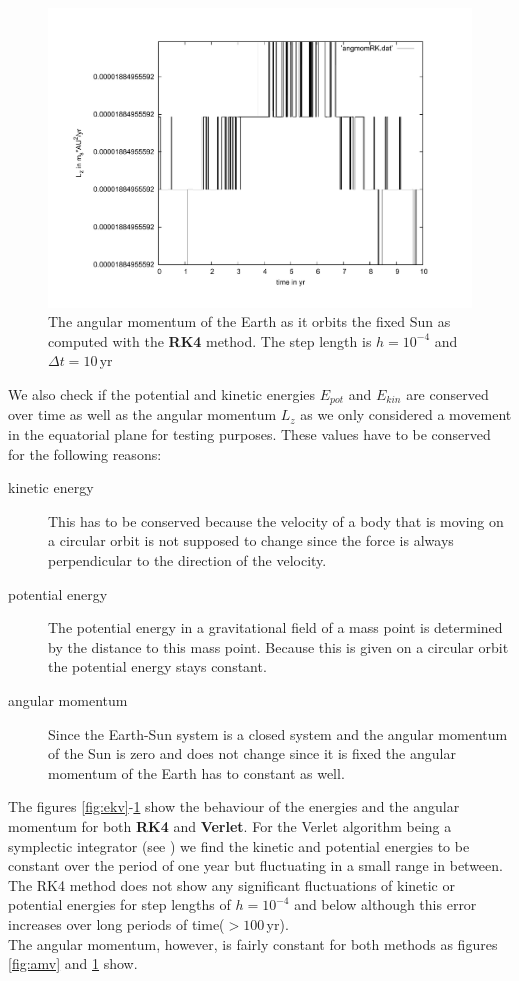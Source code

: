 \documentclass[11pt,a4wide]{article}
\begin{document}
	\begin{figure}
		\centering
			\includegraphics[scale=0.45]{angmomRK.pdf}
		\caption{The angular momentum of the Earth as it orbits the fixed Sun as computed with the \textbf{RK4} method. The step length is $h=10^{-4}$ and $\Delta t=10$\,yr}
		\label{fig:amrk}
	\end{figure}
We also check if the potential and kinetic energies $E_{pot}$ and $E_{kin}$ are conserved over time as well as the angular momentum $L_z$ as we only considered a movement in the equatorial plane for testing purposes. These values have to be conserved for the following reasons:
 \begin{description}
	\item[kinetic energy] This has to be conserved because the velocity of a body that is moving on a circular orbit is not supposed to change since the force is always perpendicular to the direction of the velocity.
	\item[potential energy] The potential energy in a gravitational field of a mass point is determined by the distance to this mass point. Because this is given on a circular orbit the potential energy stays constant.
	\item[angular momentum] Since the Earth-Sun system is a closed system and the angular momentum of the Sun is zero and does not change since it is fixed the angular momentum of the Earth has to constant as well.
 \end{description}

The figures \ref{fig:ekv}-\ref{fig:amrk} show the behaviour of the energies and the angular momentum for both \textbf{RK4} and \textbf{Verlet}. For the Verlet algorithm being a symplectic integrator (see \cite{Donnelly}) we find the kinetic and potential energies to be constant over the period of one year but fluctuating in a small range in between. The RK4 method does not show any significant fluctuations of kinetic or potential energies for step lengths of $h=10^{-4}$ and below although this error increases over long periods of time($>100$\,yr). 
\\
The angular momentum, however, is fairly constant for both methods as figures \ref{fig:amv} and \ref{fig:amrk} show.  
\end{document}
